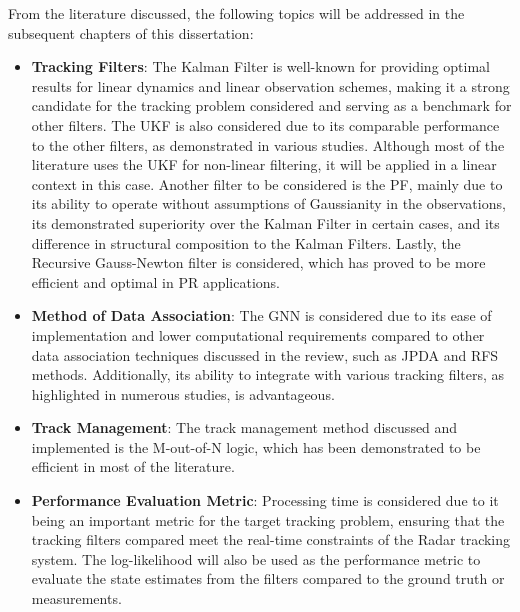 From the literature discussed, the following topics will be addressed in the subsequent chapters of this dissertation:
\newline
\begin{itemize}
    \item \textbf{Tracking Filters}:
        \newline
        The Kalman Filter is well-known for providing optimal results for linear dynamics and linear observation schemes, making it a strong candidate for the tracking problem considered and serving as a benchmark for other filters. The \ac{UKF} is also considered due to its comparable performance to the other filters, as demonstrated in various studies. Although most of the literature uses the \ac{UKF} for non-linear filtering, it will be applied in a linear context in this case. Another filter to be considered is the \ac{PF}, mainly due to its ability to operate without assumptions of Gaussianity in the observations, its demonstrated superiority over the Kalman Filter in certain cases, and its difference in structural composition to the Kalman Filters. Lastly, the Recursive Gauss-Newton filter is considered, which has proved to be more efficient and optimal in \ac{PR} applications.
    \item \textbf{Method of Data Association}:
        \newline
        The \ac{GNN} is considered due to its ease of implementation and lower computational requirements compared to other data association techniques discussed in the review, such as \ac{JPDA} and \ac{RFS} methods. Additionally, its ability to integrate with various tracking filters, as highlighted in numerous studies, is advantageous.
    \item  \textbf{Track Management}:
        \newline
        The track management method discussed and implemented is the M-out-of-N logic, which has been demonstrated to be efficient in most of the literature.
    \item  \textbf{Performance Evaluation Metric}:
        \newline
        Processing time is considered due to it being an important metric for the target tracking problem, ensuring that the tracking filters compared meet the real-time constraints of the \ac{Radar} tracking system. The log-likelihood will also be used as the performance metric to evaluate the state estimates from the filters compared to the ground truth or measurements.
\end{itemize}
